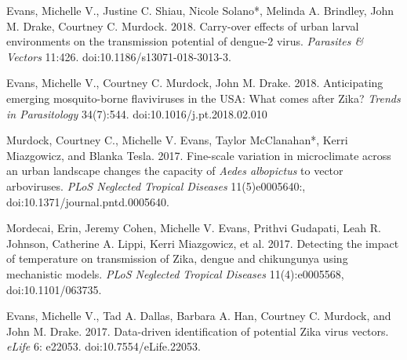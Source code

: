\begin{etaremune}
\item \textcolor{awesome}{Evans, Michelle V.}, Justine C. Shiau, Nicole Solano*, Melinda A. Brindley, John M. Drake, Courtney C. Murdock. 2018. Carry-over effects of urban larval environments on the transmission potential of dengue-2 virus. \textit{Parasites \& Vectors} 11:426. doi:10.1186/s13071-018-3013-3.

\item \textcolor{awesome}{Evans, Michelle V.}, Courtney C. Murdock, John M. Drake. 2018. Anticipating emerging mosquito-borne flaviviruses in the USA: What comes after Zika? \textit{Trends in Parasitology} 34(7):544. \linebreak doi:10.1016/j.pt.2018.02.010

\item Murdock, Courtney C., \textcolor{awesome}{Michelle V. Evans}, Taylor McClanahan*, Kerri Miazgowicz, and Blanka Tesla. 2017. Fine-scale variation in microclimate across an urban landscape changes the capacity of \textit{Aedes albopictus} to vector arboviruses. \textit{PLoS Neglected Tropical Diseases} 11(5)e0005640:, \linebreak doi:10.1371/journal.pntd.0005640.
\smallskip

\item Mordecai, Erin, Jeremy Cohen, \textcolor{awesome}{Michelle V. Evans}, Prithvi Gudapati, Leah R. Johnson, Catherine A. Lippi, Kerri Miazgowicz, et al. 2017. Detecting the impact of temperature on transmission of Zika, dengue and chikungunya using mechanistic models. \textit{PLoS Neglected Tropical Diseases} 11(4):e0005568, \linebreak doi:10.1101/063735.
\smallskip

\item \textcolor{awesome}{Evans, Michelle V.}, Tad A. Dallas, Barbara A. Han, Courtney C. Murdock, and John M. Drake. 2017. Data-driven identification of potential Zika virus vectors. \textit{eLife} 6: e22053. doi:10.7554/eLife.22053.
\end{etaremune}

\bigskip
